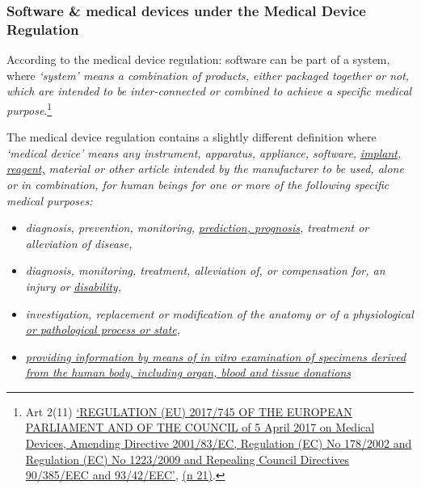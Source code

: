 \documentclass[
]{scrartcl}
\begin{document}
\hypertarget{software-medical-devices-under-the-medical-device-regulation}{%
\subsubsection{Software \& medical devices under the Medical Device Regulation}\label{software-medical-devices-under-the-medical-device-regulation}}

According to the medical device regulation: software can be part of a system, where \emph{`system' means a combination of products, either packaged together or not, which are intended to be inter-connected or combined to achieve a specific medical purpose}.\footnote{Art 2(11) \protect\hyperlink{ref-REGULATIONEU2017a}{{`{REGULATION} ({EU}) 2017/745 {OF THE EUROPEAN PARLIAMENT AND OF THE COUNCIL} of 5 {April} 2017 on Medical Devices, Amending {Directive} 2001/83/{EC}, {Regulation} ({EC}) {No} 178/2002 and {Regulation} ({EC}) {No} 1223/2009 and Repealing {Council Directives} 90/385/{EEC} and 93/42/{EEC}'}}, \protect\hyperlink{ref-REGULATIONEU2017a}{(n 21)}.}

The medical device regulation contains a slightly different definition where \emph{`medical device' means any instrument, apparatus, appliance, software,} \emph{\underline{implant, reagent,}} \emph{material or other article intended by the manufacturer to be used, alone or in combination, for human beings for one or more of the following specific medical purposes:}

\begin{itemize}
\item
  \emph{diagnosis, prevention, monitoring,} \emph{\underline{prediction, prognosis}, treatment or alleviation of disease,}
\item
  \emph{diagnosis, monitoring, treatment, alleviation of, or compensation for, an injury or} \emph{\underline{disability},}
\item
  \emph{investigation, replacement or modification of the anatomy or of a physiological} \emph{\underline{or pathological process or state},}
\item
  \emph{\underline{providing information by means of in vitro examination of specimens derived from the human body, including organ, blood and tissue donations}}
\end{itemize}
\end{document}
